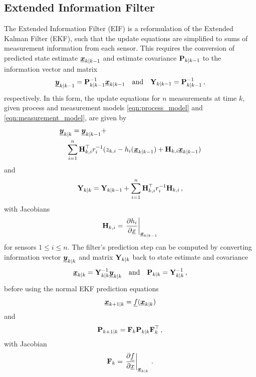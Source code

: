 \documentclass[10pt,journal,compsoc]{IEEEtran}
\theoremstyle{definition}
\theoremstyle{definition}
\theoremstyle{remark}
\begin{document}
\subsection{Extended Information Filter}
The Extended Information Filter (EIF) \cite{maybeckStochasticModelsEstimation1982} is a reformulation of the Extended Kalman Filter (EKF), such that the update equations are simplified to sums of measurement information from each sensor. This requires the conversion of predicted state estimate ${\boldsymbol{\underline{x}}}_{k|k-1}$ and estimate covariance ${{\mathbf{P}}}_{k|k-1}$ to the information vector and matrix
\begin{equation}
    {\boldsymbol{\underline{y}}}_{k|k-1} = {{\mathbf{P}}}_{k|k-1}^{-1}{\boldsymbol{\underline{x}}}_{k|k-1} \quad\textrm{and}\quad {\ensuremath{{\mathbf{Y}}}}_{k|k-1} = {{\mathbf{P}}}_{k|k-1}^{-1}\,,
\end{equation}
respectively. In this form, the update equations for $n$ measurements at time $k$, given process and measurement models \eqref{eqn:process_model} and \eqref{eqn:measurement_model}, are given by
\begin{equation}
    \begin{split}
        &\rvec{y}_{k|k} = \rvec{y}_{k|k-1} + \\
        &\quad \sum^n_{i=1}\mat{H}^\top_{k,i} r^{-1}_i (z_{k,i} - h_i(\rvec{x}_{k|k-1}) + \mat{H}_{k,i}\rvec{x}_{k|k-1})
    \end{split} \label{eqn:eif_info_vec_update}
\end{equation}
and
\begin{equation}
    \mat{Y}_{k|k} = \mat{Y}_{k|k-1} + \sum^n_{i=1}\mat{H}^\top_{k,i} r^{-1}_i \mat{H}_{k,i}\,, \label{eqn:eif_info_mat_update}
\end{equation}
with Jacobians
\begin{equation}
    \mat{H}_{k,i} = \left.\frac{\partial h_i}{\partial \vec{x}}\right|_{\rvec{x}_{k|k-1}} \label{eqn:measurement_jacobian}
\end{equation}
for sensors $1 \leq i \leq n$. The filter's prediction step can be computed by converting information vector ${\boldsymbol{\underline{y}}}_{k|k}$ and matrix ${{\mathbf{Y}}}_{k|k}$ back to state estimate and covariance 
\begin{equation}
    {\boldsymbol{\underline{x}}}_{k|k} = {{\mathbf{Y}}}_{k|k}^{-1}{\boldsymbol{\underline{y}}}_{k|k} \quad\textrm{and}\quad {\ensuremath{{\mathbf{P}}}}_{k|k} = {{\mathbf{Y}}}_{k|k}^{-1}\,,
\end{equation}
before using the normal EKF prediction equations
\begin{equation}
    {\boldsymbol{\underline{x}}}_{k+1|k} = {\underline{f}}({\boldsymbol{\underline{x}}}_{k|k})
\end{equation}
and
\begin{equation}
    {\ensuremath{{\mathbf{P}}}}_{k+1|k} = {{\mathbf{F}}}_k{{\mathbf{P}}}_{k|k}{{\mathbf{F}}}_k^\top\,,
\end{equation}
with Jacobian
\begin{equation}
    \mat{F}_{k} = \left.\frac{\partial \vec{f}}{\partial \vec{x}}\right|_{\rvec{x}_{k|k}}\,. \label{eqn:jacobian_f}
\end{equation}
\end{document}
